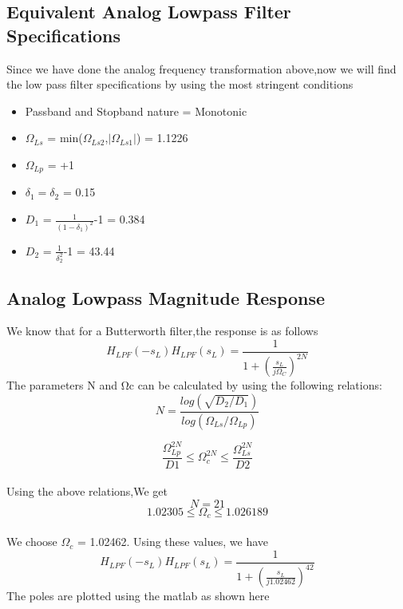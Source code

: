 \documentclass[12pt]{article}
\begin{document}
\subsection{\textbf{Equivalent Analog Lowpass Filter Specifications}}
Since we have done the analog frequency transformation above,now we will find the low pass filter specifications by using the most stringent conditions \\
\begin{itemize}
    \item Passband and Stopband nature = Monotonic
    \item $\Omega_{Ls}$ = min($\Omega_{Ls2}$,$\left|\Omega_{Ls1}\right|$) = 1.1226
    \item $\Omega_{Lp}$ = +1
    \item $\delta_1 = \delta_2$ = 0.15
    \item $D_1$ = $\frac{1}{(1-\delta_1)^2}$-1 = 0.384
    \item $D_2$ = $\frac{1}{\delta_2^2}$-1 = 43.44
\end{itemize}
\subsection{\textbf{Analog Lowpass Magnitude Response}}
We know that for a Butterworth filter,the response is as follows
\begin{equation*}
    H_{LPF}(-s_L) H_{LPF}(s_L) = \frac{1}{1+(\frac{s_L}{j\Omega_C})^{2N}}
\end{equation*}
The parameters N and Ωc can be calculated by using the following relations:
\begin{equation*}
    N = \frac{log(\sqrt{D_2/D_1})}{log(\Omega_{Ls}/\Omega_{Lp})}
\end{equation*}



\begin{equation*}
    \frac{\Omega_{Lp}^{2N}}{D1} \leq \Omega_{c}^{2N} \leq \frac{\Omega_{Ls}^{2N}}{D2}
\end{equation*}\\
Using the above relations,We get\\
\begin{equation*}
    N = 21
\end{equation*}
\begin{equation*}
   1.02305 \leq \Omega_c \leq 1.026189
\end{equation*}\\
We choose $\Omega_c$ = 1.02462. Using these values, we have\\
\begin{equation*}
    H_{LPF}(-s_L) H_{LPF}(s_L) = \frac{1}{1+(\frac{s_L}{j1.02462})^{42}}
\end{equation*}
The poles are plotted using the matlab as shown here
\end{document}

